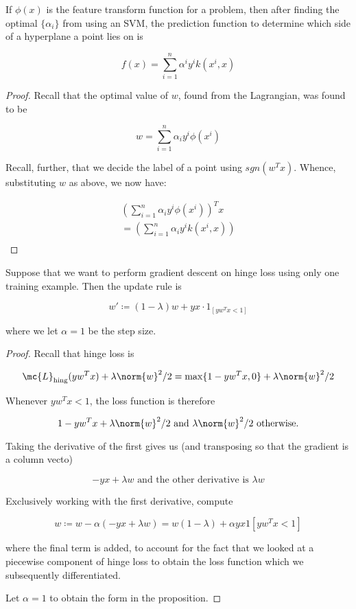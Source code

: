 \documentclass[../main.tex]{subfiles}
\begin{document}
\begin{proposition}
    If $\phi(x)$ is the feature transform function for a problem, then after finding the 
    optimal $\{\alpha_{i}\}$ from using an SVM, the prediction function to determine which
    side of a hyperplane a point lies on is

    \[
        f(x) = \sum_{i=1}^{n}\alpha^{i}y^{i}k(x^{i},x)
    \]
\end{proposition}

\begin{proof}
    Recall that the optimal value of $w$, found from the Lagrangian, was found to be

    \[
        w = \sum_{i=1}^{n}\alpha_{i}y^{i}\phi(x^{i})
    \]

    Recall, further, that we decide the label of a point using $sgn(w^Tx)$. Whence,
    substituting $w$ as above, we now have:

    \begin{align*}
        \left(\sum_{i=1}^{n}\alpha_{i}y^{i}\phi(x^{i})\right)^Tx  \\
        = \left(\sum_{i=1}^{n}\alpha_{i}y^{i}k(x^{i}, x)\right)  \\
    \end{align*}
\end{proof}

\begin{proposition}
    Suppose that we want to perform gradient descent on hinge loss using only one training
    example. Then the update rule is

    \[
        w' \coloneq (1 - \lambda)w + yx \cdot 1_{[yw^Tx < 1]}
    \]

    where we let $\alpha = 1$ be the step size.
\end{proposition}

\begin{proof}
    Recall that hinge loss is 

    \[
        \mc{L}_{\text{hing}}(yw^Tx) + \lambda \norm{w}^2/2 = \max\{1 - yw^Tx, 0\} + \lambda \norm{w}^2/2
    \]

    Whenever $yw^Tx < 1$, the loss function is therefore

    \[
        1 - yw^Tx + \lambda \norm{w}^2/2 \text{ and } \lambda \norm{w}^2/2 \text{ otherwise}.
    \]

    Taking the derivative of the first gives us (and transposing so that the gradient is a column vecto)

    \[
        -yx + \lambda w \text{ and the other derivative is } \lambda w
    \]

    Exclusively working with the first derivative, compute

    \[
        w \coloneq w - \alpha(-yx + \lambda w) = w(1 - \lambda) + \alpha yx 1[yw^Tx < 1]
    \]

    where the final term is added, to account for the fact that we looked at a piecewise
    component of hinge loss to obtain the loss function which we subsequently differentiated.

    Let $\alpha = 1$ to obtain the form in the proposition.
\end{proof}
\end{document}
